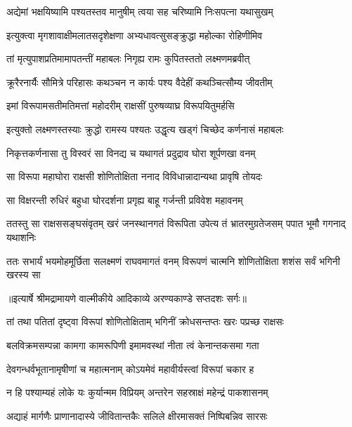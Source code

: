 \twolineshloka
{अद्येमां भक्षयिष्यामि पश्यतस्तव मानुषीम्}
{त्वया सह चरिष्यामि निःसपत्ना यथासुखम्} %

\twolineshloka
{इत्युक्त्वा मृगशावाक्षीमलातसदृशेक्षणा}
{अभ्यधावत्सुसङ्क्रुद्धा महोल्का रोहिणीमिव} %

\twolineshloka
{तां मृत्युपाशप्रतिमामापतन्तीं महाबलः}
{निगृह्य रामः कुपितस्ततो लक्ष्मणमब्रवीत्} %

\twolineshloka
{क्रूरैरनार्यैः सौमित्रे परिहासः कथञ्चन}
{न कार्यः पश्य वैदेहीं कथञ्चित्सौम्य जीवतीम्} %

\twolineshloka
{इमां विरूपामसतीमतिमत्तां महोदरीम्}
{राक्षसीं पुरुषव्याघ्र विरूपयितुमर्हसि} %

\twolineshloka
{इत्युक्तो लक्ष्मणस्तस्याः क्रुद्धो रामस्य पश्यतः}
{उद्धृत्य खड्गं चिच्छेद कर्णनासं महाबलः} %

\twolineshloka
{निकृत्तकर्णनासा तु विस्वरं सा विनद्य च}
{यथागतं प्रदुद्राव घोरा शूर्पणखा वनम्} %

\twolineshloka
{सा विरूपा महाघोरा राक्षसी शोणितोक्षिता}
{ननाद विविधान्नादान्यथा प्रावृषि तोयदः} %

\twolineshloka
{सा विक्षरन्ती रुधिरं बहुधा घोरदर्शना}
{प्रगृह्य बाहू गर्जन्ती प्रविवेश महावनम्} %

\fourlineindentedshloka
{ततस्तु सा राक्षससङ्घसंवृतम्}
{खरं जनस्थानगतं विरूपिता}
{उपेत्य तं भ्रातरमुग्रतेजसम्}
{पपात भूमौ गगनाद् यथाशनिः} %

\fourlineindentedshloka
{ततः सभार्यं भयमोहमूर्छिता}
{सलक्ष्मणं राघवमागतं वनम्}
{विरूपणं चात्मनि शोणितोक्षिता}
{शशंस सर्वं भगिनी खरस्य सा} %


{॥इत्यार्षे श्रीमद्रामायणे वाल्मीकीये आदिकाव्ये अरण्यकाण्डे सप्तदशः सर्गः॥}


\twolineshloka
{तां तथा पतितां दृष्ट्वा विरूपां शोणितोक्षिताम्}
{भगिनीं क्रोधसन्तप्तः खरः पप्रच्छ राक्षसः} %

\twolineshloka
{बलविक्रमसम्पन्ना कामगा कामरूपिणी}
{इमामवस्थां नीता त्वं केनान्तकसमा गता} %

\twolineshloka
{देवगन्धर्वभूतानामृषीणां च महात्मनाम्}
{कोऽयमेवं महावीर्यस्त्वां विरूपां चकार ह} %

\twolineshloka
{न हि पश्याम्यहं लोके यः कुर्यान्मम विप्रियम्}
{अन्तरेन सहस्राक्षं महेन्द्रं पाकशासनम्} %

\twolineshloka
{अद्याहं मार्गणैः प्राणानादास्ये जीवितान्तकैः}
{सलिले क्षीरमासक्तं निष्पिबन्निव सारसः} %

